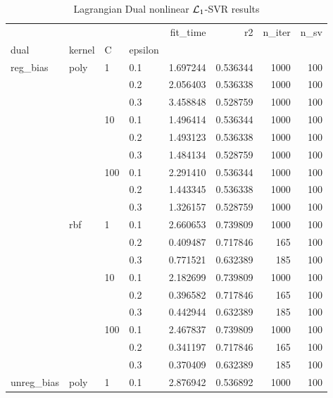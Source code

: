 \begin{table}[H]
\centering
\caption{Lagrangian Dual nonlinear $\protect \mathcal{L}_1$-SVR results}
\label{nonlinear_lagrangian_dual_l1_svr_cv_results}
\begin{tabular}{llllrrrr}
\toprule
           &     &     &     &  fit\_time &        r2 &  n\_iter &  n\_sv \\
dual & kernel & C & epsilon &           &           &         &       \\
\midrule
reg\_bias & poly & 1   & 0.1 &  1.697244 &  0.536344 &    1000 &   100 \\
           &     &     & 0.2 &  2.056403 &  0.536338 &    1000 &   100 \\
           &     &     & 0.3 &  3.458848 &  0.528759 &    1000 &   100 \\
           &     & 10  & 0.1 &  1.496414 &  0.536344 &    1000 &   100 \\
           &     &     & 0.2 &  1.493123 &  0.536338 &    1000 &   100 \\
           &     &     & 0.3 &  1.484134 &  0.528759 &    1000 &   100 \\
           &     & 100 & 0.1 &  2.291410 &  0.536344 &    1000 &   100 \\
           &     &     & 0.2 &  1.443345 &  0.536338 &    1000 &   100 \\
           &     &     & 0.3 &  1.326157 &  0.528759 &    1000 &   100 \\
           & rbf & 1   & 0.1 &  2.660653 &  0.739809 &    1000 &   100 \\
           &     &     & 0.2 &  0.409487 &  0.717846 &     165 &   100 \\
           &     &     & 0.3 &  0.771521 &  0.632389 &     185 &   100 \\
           &     & 10  & 0.1 &  2.182699 &  0.739809 &    1000 &   100 \\
           &     &     & 0.2 &  0.396582 &  0.717846 &     165 &   100 \\
           &     &     & 0.3 &  0.442944 &  0.632389 &     185 &   100 \\
           &     & 100 & 0.1 &  2.467837 &  0.739809 &    1000 &   100 \\
           &     &     & 0.2 &  0.341197 &  0.717846 &     165 &   100 \\
           &     &     & 0.3 &  0.370409 &  0.632389 &     185 &   100 \\
unreg\_bias & poly & 1   & 0.1 &  2.876942 &  0.536892 &    1000 &   100 \\

\end{tabular}
\end{table}
